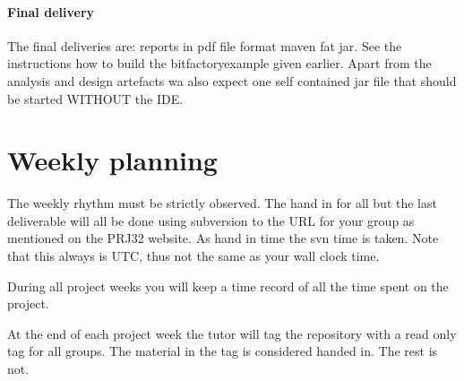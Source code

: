 \paragraph{Final delivery} The final deliveries are: reports in pdf file format 
maven fat jar. See the instructions how to build the bitfactoryexample
given earlier.
Apart from the analysis and design artefacts wa also expect one self
contained jar file that should be started WITHOUT the IDE.



\section{Weekly planning}
The weekly rhythm must be strictly observed. The hand in for all but
the last deliverable will all be done using subversion to the URL
for your group as mentioned on the PRJ32 website. As hand in time the
svn time is taken. Note that this always is UTC, thus not the same as
your wall clock time.

During all project weeks you will keep a time record of all
the time spent on the project.

At the end of each project week the tutor will tag the repository with
a read only tag for all groups. The material in the tag is considered
handed in. The rest is not.

